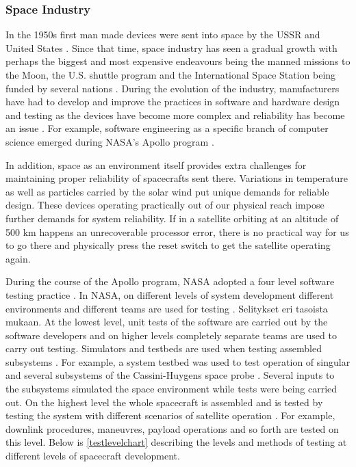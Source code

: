\documentclass[english,12pt,a4paper,pdftex,elec,utf8]{aaltothesis}
\begin{document}
\subsubsection{Space Industry}
In the 1950s first man made devices were sent into space by the USSR and United States \cite{aftersputnik}. Since that time, space industry has seen a gradual growth with perhaps the biggest and most expensive endeavours being the manned missions to the Moon, the U.S. shuttle program and the International Space Station being funded by several nations \cite{nasacosts}. During the evolution of the industry, manufacturers have had to develop and improve the practices in software and hardware design and testing as the devices have become more complex and reliability has become an issue \cite{compinspace}. For example, software engineering as a specific branch of computer science emerged during NASA's Apollo program \cite{compinspace}.\par 
In addition, space as an environment itself provides extra challenges for maintaining proper reliability of spacecrafts sent there. Variations in temperature as well as particles carried by the solar wind put unique demands for reliable design. These devices operating practically out of our physical reach impose further demands for system reliability. If in a satellite orbiting at an altitude of 500 km happens an unrecoverable processor error, there is no practical way for us to go there and physically press the reset switch to get the satellite operating again. \cite{spacesystemsengineering} \par
During the course of the Apollo program, NASA adopted a four level software testing practice \cite{compinspace}. In NASA, on different levels of system development different environments and different teams are used for testing \cite{softacceptancespace}. Selitykset eri tasoista \cite{softacceptancespace} mukaan. At the lowest level, unit tests of the software are carried out by the software developers and on higher levels completely separate teams are used to carry out testing. Simulators and testbeds are used when testing assembled subsystems \cite{softacceptancespace, cassinitestbed}. For example, a system testbed was used to test operation of singular and several subsystems of the Cassini-Huygens space probe \cite{cassinitestbed}. Several inputs to the subsystems simulated the space environment while tests were being carried out. On the highest level the whole spacecraft is assembled and is tested by testing the system with different scenarios of satellite operation \cite{softacceptancespace, tor}. For example, downlink procedures, maneuvres, payload operations and so forth are tested on this level. Below is \ref{testlevelchart} describing the levels and methods of testing at different levels of spacecraft development. \par
\end{document}
